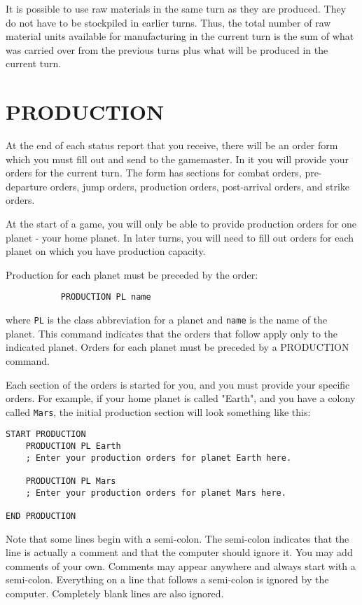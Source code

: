 \documentclass[10pt,titlepage]{article}
\begin{document}
It is possible to use raw materials in the same turn as they are produced.
They do not have to be stockpiled in earlier turns.  Thus, the total number of
raw material units available for manufacturing in the current turn is the sum
of what was carried over from the previous turns plus what will be produced in
the current turn.



\section{PRODUCTION}
\label{sec:production}

At the end of each status report that you receive, there will be an order form
which you must fill out and send to the gamemaster.  In it you will provide
your orders for the current turn.  The form has sections for combat orders,
pre-departure orders, jump orders, production orders, post-arrival orders,
and strike orders.

At the start of a game, you will only be able to provide production orders
for one planet - your home planet.  In later turns, you will need to fill
out orders for each planet on which you have production capacity.

Production for each planet must be preceded by the order:
\begin{verbatim}
           PRODUCTION PL name
\end{verbatim}
where \texttt{PL} is the class abbreviation for a planet and \texttt{name} is the name of the
planet.  This command indicates that the orders that follow apply only to the
indicated planet.  Orders for each planet must be preceded by a PRODUCTION
command.

Each section of the orders is started for you, and you must provide your
specific orders.  For example, if your home planet is called "Earth", and you
have a colony called \texttt{Mars}, the initial production section will look something
like this:
\begin{verbatim}
START PRODUCTION
    PRODUCTION PL Earth
    ; Enter your production orders for planet Earth here.

    PRODUCTION PL Mars
    ; Enter your production orders for planet Mars here.

END PRODUCTION
\end{verbatim}
Note that some lines begin with a semi-colon.  The semi-colon indicates that
the line is actually a comment and that the computer should ignore it.  You may
add comments of your own.  Comments may appear anywhere and always start with a
semi-colon.  Everything on a line that follows a semi-colon is ignored by the
computer.  Completely blank lines are also ignored.
\end{document}
